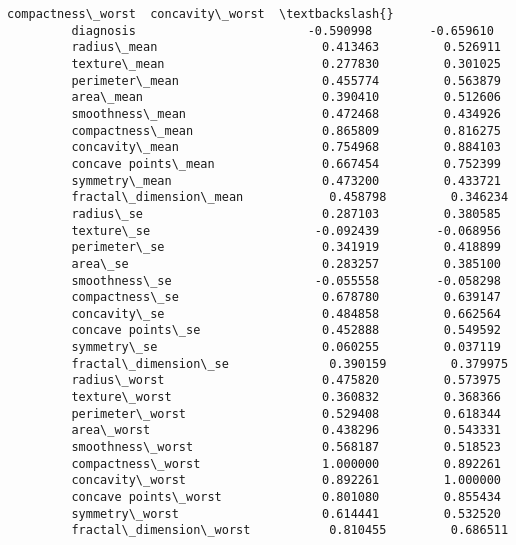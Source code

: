 \documentclass[11pt]{article}
\begin{document}
\begin{Verbatim}[commandchars=\\\{\}]
                                  compactness\_worst  concavity\_worst  \textbackslash{}
         diagnosis                        -0.590998        -0.659610   
         radius\_mean                       0.413463         0.526911   
         texture\_mean                      0.277830         0.301025   
         perimeter\_mean                    0.455774         0.563879   
         area\_mean                         0.390410         0.512606   
         smoothness\_mean                   0.472468         0.434926   
         compactness\_mean                  0.865809         0.816275   
         concavity\_mean                    0.754968         0.884103   
         concave points\_mean               0.667454         0.752399   
         symmetry\_mean                     0.473200         0.433721   
         fractal\_dimension\_mean            0.458798         0.346234   
         radius\_se                         0.287103         0.380585   
         texture\_se                       -0.092439        -0.068956   
         perimeter\_se                      0.341919         0.418899   
         area\_se                           0.283257         0.385100   
         smoothness\_se                    -0.055558        -0.058298   
         compactness\_se                    0.678780         0.639147   
         concavity\_se                      0.484858         0.662564   
         concave points\_se                 0.452888         0.549592   
         symmetry\_se                       0.060255         0.037119   
         fractal\_dimension\_se              0.390159         0.379975   
         radius\_worst                      0.475820         0.573975   
         texture\_worst                     0.360832         0.368366   
         perimeter\_worst                   0.529408         0.618344   
         area\_worst                        0.438296         0.543331   
         smoothness\_worst                  0.568187         0.518523   
         compactness\_worst                 1.000000         0.892261   
         concavity\_worst                   0.892261         1.000000   
         concave points\_worst              0.801080         0.855434   
         symmetry\_worst                    0.614441         0.532520   
         fractal\_dimension\_worst           0.810455         0.686511   
         

\end{Verbatim}
\end{document}
